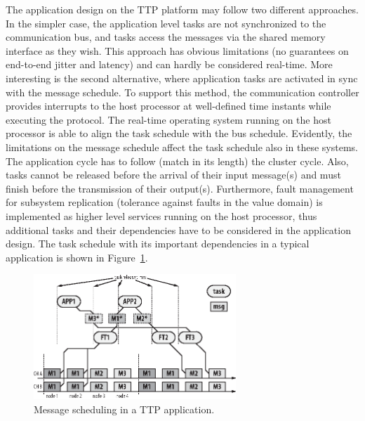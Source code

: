 The application design on the TTP platform may follow two different
approaches. In the simpler case, the application level tasks are not
synchronized to the communication bus, and tasks access the messages via
the shared memory interface as they wish. This approach has obvious
limitations (no guarantees on end-to-end jitter and latency) and can
hardly be considered real-time. More interesting is the second
alternative, where application tasks are activated in sync with the
message schedule. To support this method, the communication
controller provides interrupts to the host processor at well-defined
time instants while executing the protocol. The real-time operating
system running on the host processor is able to align the task
schedule with the bus schedule. Evidently, the limitations on the
message schedule affect the task schedule also in these systems. The
application cycle has to follow (match in its length) the cluster
cycle. Also, tasks cannot be released before the arrival of their
input message(s) and must finish before the transmission of their
output(s). Furthermore, fault management for subsystem replication
(tolerance against faults in the value domain) is implemented as
higher level services running on the host processor, thus additional
tasks and their dependencies have to be considered in the
application design. The task schedule with its important
dependencies in a typical application is shown in
Figure~\ref{fig:TTPAppSchedule}.

\begin{figure}[h]
\begin{center}
   \includegraphics[width=3in]{TTPAppSchedule}
   \caption{Message scheduling in a TTP application.}
   \label{fig:TTPAppSchedule}
\end{center}
\end{figure}